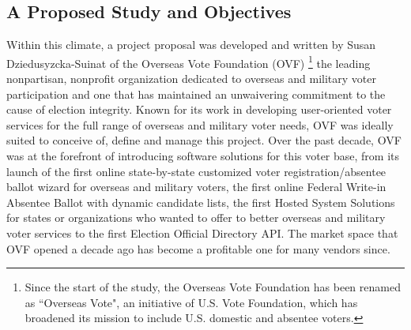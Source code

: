 \subsection{A Proposed Study and Objectives}
\label{sec:proposed-study-and-objectives}

Within this climate, 
a project proposal was developed and written by Susan Dziedusyzcka-Suinat 
of the Overseas Vote Foundation (OVF) \footnote{Since the start of 
  the study, the Overseas Vote Foundation has been renamed as ``Overseas 
  Vote", an initiative of U.S. Vote Foundation, which has broadened its 
  mission to include U.S. domestic and absentee voters.} 
the leading nonpartisan, nonprofit organization dedicated to overseas 
and military voter participation and one that has maintained an unwaivering
commitment to the cause of election integrity. Known for its work in 
developing user-oriented voter services for the full range of overseas
and military voter needs, OVF was ideally suited to conceive of, define
and manage this project. Over the past decade, OVF was at the forefront 
of introducing software solutions for this voter base, from its launch 
of the first online state-by-state customized voter registration/absentee 
ballot wizard for overseas and military voters, the first online Federal 
Write-in Absentee Ballot with dynamic candidate lists, the first Hosted 
System Solutions for states or organizations who wanted to offer to better 
overseas and military voter services to the first Election Official 
Directory API. The market space that OVF opened a decade ago has become 
a profitable one for many vendors since. 


